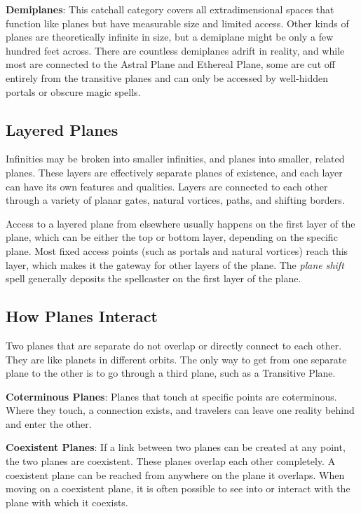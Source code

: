 \textbf{Demiplanes}: This catchall category covers all extradimensional spaces that function like planes but have measurable size and limited access. Other kinds of planes are theoretically infinite in size, but a demiplane might be only a few hundred feet across. There are countless demiplanes adrift in reality, and while most are connected to the Astral Plane and Ethereal Plane, some are cut off entirely from the transitive planes and can only be accessed by well-hidden portals or obscure magic spells.
				
\subsection{Layered Planes}

				
Infinities may be broken into smaller infinities, and planes into smaller, related planes. These layers are effectively separate planes of existence, and each layer can have its own features and qualities. Layers are connected to each other through a variety of planar gates, natural vortices, paths, and shifting borders.
				
Access to a layered plane from elsewhere usually happens on the first layer of the plane, which can be either the top or bottom layer, depending on the specific plane. Most fixed access points (such as portals and natural vortices) reach this layer, which makes it the gateway for other layers of the plane. The \textit{plane shift} spell generally deposits the spellcaster on the first layer of the plane.
				
\subsection{How Planes Interact}

				
Two planes that are separate do not overlap or directly connect to each other. They are like planets in different orbits. The only way to get from one separate plane to the other is to go through a third plane, such as a Transitive Plane.
				
\textbf{Coterminous Planes}: Planes that touch at specific points are coterminous. Where they touch, a connection exists, and travelers can leave one reality behind and enter the other.
				
\textbf{Coexistent Planes}: If a link between two planes can be created at any point, the two planes are coexistent. These planes overlap each other completely. A coexistent plane can be reached from anywhere on the plane it overlaps. When moving on a coexistent plane, it is often possible to see into or interact with the plane with which it coexists. 
				
